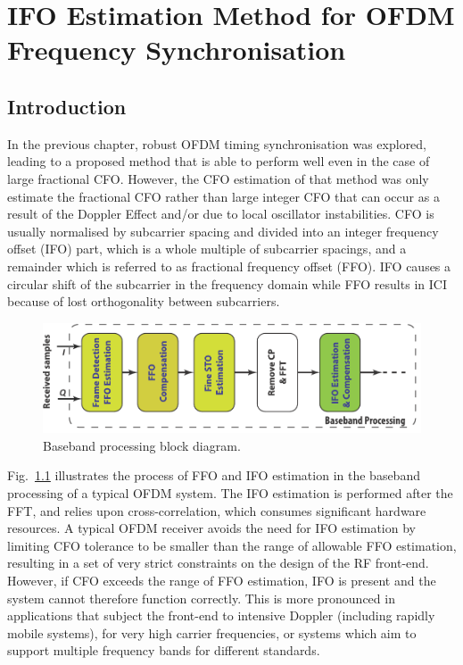 \chapter{IFO Estimation Method for OFDM Frequency Synchronisation}
\label{chap:CFO}

\section{Introduction}
In the previous chapter, robust OFDM timing synchronisation was explored, leading to a proposed method that is able to perform well even in the case of large fractional CFO.
However, the CFO estimation of that method was only estimate the fractional CFO rather than large integer CFO that can occur as a result of the Doppler Effect and/or due to local oscillator instabilities.
CFO is usually normalised by subcarrier spacing and divided into an integer frequency offset (IFO) part, which is a whole multiple of subcarrier spacings, and a remainder which is referred to as fractional frequency offset (FFO).
IFO causes a circular shift of the subcarrier in the frequency domain while FFO results in ICI because of lost orthogonality between subcarriers.
\begin{figure}[b]
    \centerline{\includegraphics [width=0.9\columnwidth] {figures/Baseband.pdf} }
    \caption{Baseband processing block diagram.}
    \label{fig:baseband}
\end{figure}
Fig.~\ref{fig:baseband} illustrates the process of FFO and IFO estimation in the baseband processing of a typical OFDM system.
The IFO estimation is performed after the FFT, and relies upon cross-correlation, which consumes significant hardware resources.
A typical OFDM receiver avoids the need for IFO estimation by limiting CFO tolerance to be smaller than the range of allowable FFO estimation, resulting in a set of very strict constraints on the design of the RF front-end. However, if CFO exceeds the range of FFO estimation, IFO is present and the system cannot therefore function correctly.
This is more pronounced in applications that subject the front-end to intensive Doppler (including rapidly mobile systems), for very high carrier frequencies, or systems which aim to support multiple frequency bands for different standards.

